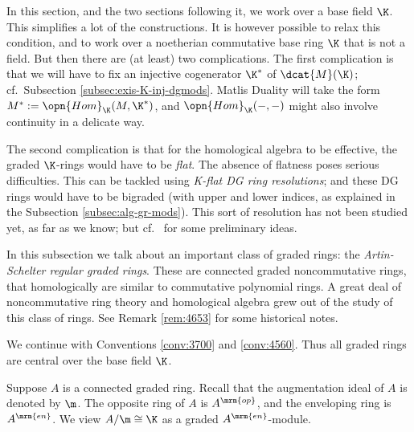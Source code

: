\begin{rem} \label{rem:3740}
In this section, and the two sections following it, we work over a base field 
$\K$. This simplifies a lot of the constructions. It is however possible to 
relax this condition, and to work over a noetherian commutative base ring $\K$ 
that is not a field. But then there are (at least) two complications. 
The first complication is that we will have to fix an injective cogenerator 
$\K^*$ of $\dcat{M}(\K)$; cf.\ Subsection \ref{subsec:exis-K-inj-dgmods}. 
Matlis Duality will take the form 
$M^* := \opn{Hom}_{\K}(M, \K^*)$,
and $\opn{Hom}_{\K}(-, -)$ might also involve continuity in a delicate way. 

The second complication is that for the homological algebra to be effective, 
the graded $\K$-rings would have to be {\em flat}. 
The absence of flatness poses serious difficulties. This can be tackled using 
{\em K-flat DG ring resolutions}; and these DG rings would have to be bigraded 
(with upper and lower indices, as explained in the Subsection 
\ref{subsec:alg-gr-mods}). This sort 
of resolution has not been studied yet, as far as we know; but cf.\ 
\cite{Ye16} for some preliminary ideas. 
\end{rem}





\label{AS-reg}

In this subsection we talk about an important class of graded rings: the 
{\em Artin-Schelter regular graded rings}. These are connected graded 
noncommutative rings, that homologically are similar to commutative polynomial 
rings. A great deal of noncommutative ring theory and homological algebra grew 
out of the study of this class of rings. See Remark \ref{rem:4653} for 
some historical notes.

We continue with Conventions \ref{conv:3700} and \ref{conv:4560}. 
Thus all graded rings are central over the base field $\K$. 

Suppose $A$ is a connected graded ring. Recall that the augmentation ideal of 
$A$ is denoted by $\m$. The opposite ring of $A$ is $A^{\mrm{op}}$, and the 
enveloping ring is $A^{\mrm{en}}$.
We view $A / \m \cong \K$ as a graded $A^{\mrm{en}}$-module.

